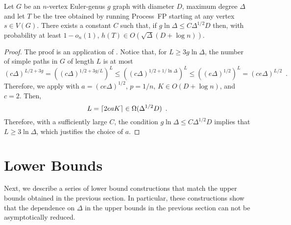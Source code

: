 \documentclass[lotsofwhite]{patmorin}
\begin{document}
\begin{thm}
  Let $G$ be an $n$-vertex Euler-genus $g$ graph with diameter $D$,
  maximum degree $\Delta$ and let $T$ be the tree obtained by running
  Process~FP starting at any vertex $s\in V(G)$.  There exists a constant
  $C$ such that, if $g\ln\Delta \le C\Delta^{1/2}D$ then,
  with probability at least $1-o_n(1)$,
  $h(T)\in O(\sqrt{\Delta}(D+\log n))$.
\end{thm}

\begin{proof}
  The proof is an application of .  Notice that,
  for $L\ge 3g\ln\Delta$, the number of simple paths in $G$ of length
  $L$ is at most
  \[
     (c\Delta)^{L/2+3g} 
        = \left((c\Delta)^{1/2+3g/L}\right)^L
        \le \left((c\Delta)^{1/2+1/\ln\Delta}\right)^L
        \le \left((e\Delta)^{1/2}\right)^L
        = (ce\Delta)^{L/2} \enspace .
  \]
  Therefore, we apply  with $a=(ce\Delta)^{1/2}$,
  $p=1/n$, $K\in O(D+\log n)$, and $c=2$.  Then,
  \[
      L={\lceil 2eaK \rceil} \in \Omega(\Delta^{1/2}D) \enspace .
  \]
  Therefore, with a sufficiently large $C$, the condition $g\ln\Delta \le C\Delta^{1/2}D$ implies that $L\ge 3\ln\Delta$, which justifies the choice of $a$.
\end{proof}


\section{Lower Bounds}

Next, we describe a series of lower bound constructions that match the
upper bounds obtained in the previous section.  In particular, these
constructions show that the dependence on $\Delta$ in the upper bounds
in the previous section can not be asymptotically reduced.
\end{document}
